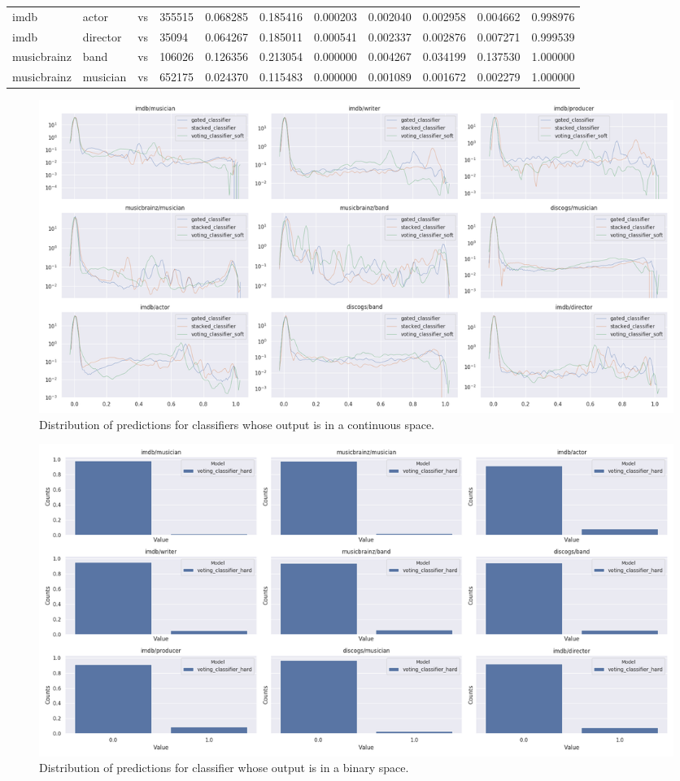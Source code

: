 \documentclass[epsfig,a4paper,11pt,titlepage,twoside,openany]{book}
\begin{document}
\begin{longtable}{|l|l|l|l|l|l|l|l|l|l|l|}
imdb        & actor    & vs & 355515 & 0.068285 & 0.185416 & 0.000203 & 0.002040 & 0.002958 & 0.004662 & 0.998976 \\
imdb        & director & vs & 35094  & 0.064267 & 0.185011 & 0.000541 & 0.002337 & 0.002876 & 0.007271 & 0.999539 \\
musicbrainz & band     & vs & 106026 & 0.126356 & 0.213054 & 0.000000 & 0.004267 & 0.034199 & 0.137530 & 1.000000 \\
musicbrainz & musician & vs & 652175 & 0.024370 & 0.115483 & 0.000000 & 0.001089 & 0.001672 & 0.002279 & 1.000000 \\ \hline
\end{longtable}

\begin{figure}[]
  \centering \includegraphics[width=\textwidth]{ensembles_classification_continuous_classifiers_distplots} 
  \caption{Distribution of predictions for classifiers whose output is in a continuous space.}
  \label{fig:apx-ensemble-classification-distplot}
\end{figure}

\begin{figure}[]
  \centering \includegraphics[width=\textwidth]{ensembles_classification_binary_classifiers_barplot} 
  \caption{Distribution of predictions for classifier whose output is in a binary space.}
  \label{fig:apx-ensemble-classification-barplot}
\end{figure}
\end{document}
